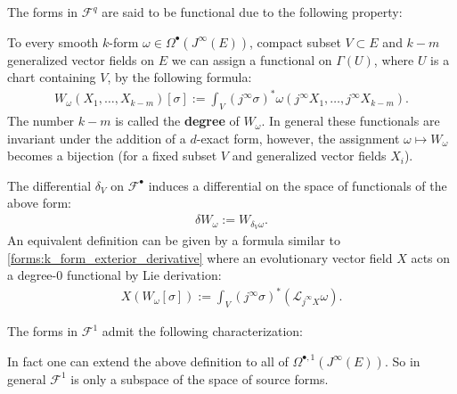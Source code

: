     The forms in $\mathcal{F}^q$ are said to be functional due to the following property:
    \begin{property}[Functionals]
        To every smooth $k$-form $\omega\in\Omega^\bullet(J^\infty(E))$, compact subset $V\subset E$ and $k-m$ generalized vector fields on $E$ we can assign a functional on $\Gamma(U)$, where $U$ is a chart containing $V$, by the following formula:
        \begin{gather}
            \label{var:functionals}
            W_\omega(X_1,\ldots,X_{k-m})[\sigma] := \int_V(j^\infty\sigma)^*\omega(j^\infty X_1,\ldots,j^\infty X_{k-m}).
        \end{gather}
        The number $k-m$ is called the \textbf{degree} of $W_\omega$. In general these functionals are invariant under the addition of a $d$-exact form, however, the assignment $\omega\mapsto W_\omega$ becomes a bijection (for a fixed subset $V$ and generalized vector fields $X_i$).
    \end{property}
    \begin{construct}
        The differential $\delta_V$ on $\mathcal{F}^\bullet$ induces a differential on the space of functionals of the above form:
        \begin{gather}
            \delta W_\omega := W_{\delta_V\omega}.
        \end{gather}
        An equivalent definition can be given by a formula similar to \ref{forms:k_form_exterior_derivative} where an evolutionary vector field $X$ acts on a degree-$0$ functional by Lie derivation:
        \begin{gather}
            X(W_\omega[\sigma]) := \int_V(j^\infty\sigma)^*(\mathcal{L}_{j^\infty X}\omega).
        \end{gather}
    \end{construct}

    The forms in $\mathcal{F}^1$ admit the following characterization:
    \begin{remark*}
        In fact one can extend the above definition to all of $\Omega^{\bullet,1}(J^\infty(E))$. So in general $\mathcal{F}^1$ is only a subspace of the space of source forms.
    \end{remark*}

